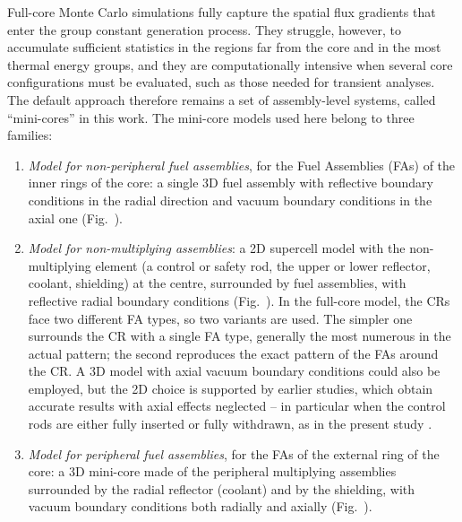 Full-core Monte Carlo simulations fully capture the spatial flux gradients that enter the group constant generation process. They struggle, however, to accumulate sufficient statistics in the regions far from the core and in the most thermal energy groups, and they are computationally intensive when several core configurations must be evaluated, such as those needed for transient analyses. The default approach therefore remains a set of assembly-level systems, called ``mini-cores'' in this work. The mini-core models used here belong to three families:
%
\begin{enumerate}
    \item \textit{Model for non-peripheral fuel assemblies}, for the Fuel Assemblies (FAs) of the inner rings of the core: a single 3D fuel assembly with reflective boundary conditions in the radial direction and vacuum boundary conditions in the axial one (Fig.~).

    \item \textit{Model for non-multiplying assemblies}: a 2D supercell model with the non-multiplying element (a control or safety rod, the upper or lower reflector, coolant, shielding) at the centre, surrounded by fuel assemblies, with reflective radial boundary conditions (Fig.~). In the full-core model, the CRs face two different FA types, so two variants are used. The simpler one surrounds the CR with a single FA type, generally the most numerous in the actual pattern; the second reproduces the exact pattern of the FAs around the CR. A 3D model with axial vacuum boundary conditions could also be employed, but the 2D choice is supported by earlier studies, which obtain accurate results with axial effects neglected -- in particular when the control rods are either fully inserted or fully withdrawn, as in the present study \cite{Nikitin_mini_core_models}.

    \item \textit{Model for peripheral fuel assemblies}, for the FAs of the external ring of the core: a 3D mini-core made of the peripheral multiplying assemblies surrounded by the radial reflector (coolant) and by the shielding, with vacuum boundary conditions both radially and axially (Fig.~).
\end{enumerate}

